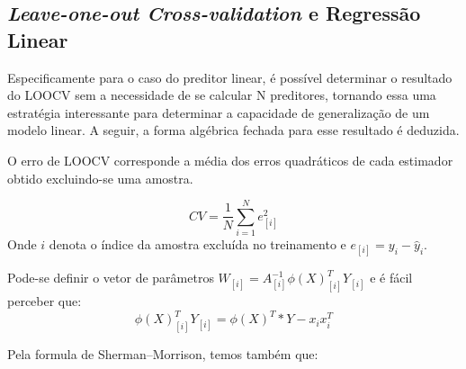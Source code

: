 \subsection{ \textit{Leave-one-out Cross-validation} e Regressão Linear}

Especificamente para o caso do preditor linear, é possível determinar o resultado do LOOCV sem a necessidade de se calcular N preditores, tornando essa uma estratégia interessante para determinar a capacidade de generalização de um modelo linear. A seguir, a forma algébrica fechada para esse resultado é deduzida.





O erro de LOOCV corresponde a média dos erros quadráticos de cada estimador obtido excluindo-se uma amostra. 

\begin{equation}
    CV = \dfrac{1}{N} \sum_{i=1}^{N}e^2_{[i]}
\end{equation}
Onde $i$ denota o índice da amostra excluída no treinamento e $e_{[i]} = y_i - \hat{y}_i$.

Pode-se definir o vetor de parâmetros $W_{[i]} = A_{[i]}^{-1}\phi(X)_{[i]}^TY_{[i]}$ e é fácil perceber que:
$${\phi(X)}_{[i]}^TY_{[i]} = \phi(X)^T*Y - x_ix_i^T$$

Pela formula de Sherman–Morrison, temos também que:



